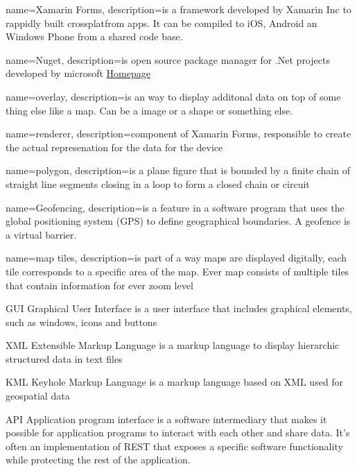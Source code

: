 
{
  name=Xamarin Forms,
  description={is a framework developed by Xamarin Inc to rappidly built crossplatfrom apps. It can be compiled to iOS, Android an Windows Phone from a shared code base.}
}

{
  name=Nuget,
  description={is open source package manager for .Net projects developed by microsoft
  \href{http://nuget.codeplex.com/}{Homepage} }
}

{
  name=overlay,
  description={is an way to display additonal data on top of some thing else like a map. Can be a image or a shape or something else.}
}

{
  name=renderer,
  description={component of Xamarin Forms, responsible to create the actual represenation for the data for the device}
}

{
  name=polygon,
  description={is a plane figure that is bounded by a finite chain of straight line segments closing in a loop to form a closed chain or circuit}
}

{
	name=Geofencing,
	description={is a feature in a software program that uses the global positioning system (GPS) to define geographical boundaries. A geofence is a virtual barrier.}
}

{
  name=map tiles,
  description={is part of a way maps are displayed digitally, each tile corresponds to a specific area of the map. Ever map consists of multiple tiles that contain information for ever zoom level}
}



  {GUI}            %
  {Graphical User Interface}  %
  {is a user interface that includes graphical elements, such as windows, icons and buttons} %

  {XML}            %
  {Extensible Markup Language}  %
  {is a markup language to display hierarchic structured data in text files} %

  {KML}            %
  {Keyhole Markup Language}  %
  {is a markup language based on XML used for geospatial data} %

	{API}            %
	{Application program interface}  %
	{is a software intermediary that makes it possible for application programs to interact with each other and share data. It's often an implementation of REST that exposes a specific software functionality while protecting the rest of the application.} %
